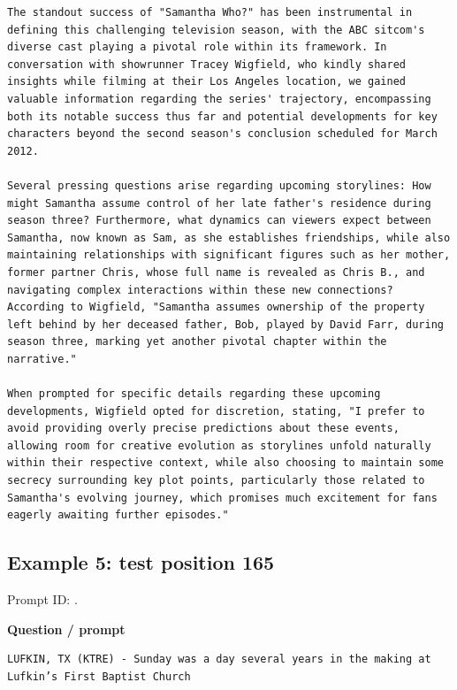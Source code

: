 \begin{Verbatim}
The standout success of "Samantha Who?" has been instrumental in defining this challenging television season, with the ABC sitcom's diverse cast playing a pivotal role within its framework. In conversation with showrunner Tracey Wigfield, who kindly shared insights while filming at their Los Angeles location, we gained valuable information regarding the series' trajectory, encompassing both its notable success thus far and potential developments for key characters beyond the second season's conclusion scheduled for March 2012.

Several pressing questions arise regarding upcoming storylines: How might Samantha assume control of her late father's residence during season three? Furthermore, what dynamics can viewers expect between Samantha, now known as Sam, as she establishes friendships, while also maintaining relationships with significant figures such as her mother, former partner Chris, whose full name is revealed as Chris B., and navigating complex interactions within these new connections? According to Wigfield, "Samantha assumes ownership of the property left behind by her deceased father, Bob, played by David Farr, during season three, marking yet another pivotal chapter within the narrative."

When prompted for specific details regarding these upcoming developments, Wigfield opted for discretion, stating, "I prefer to avoid providing overly precise predictions about these events, allowing room for creative evolution as storylines unfold naturally within their respective context, while also choosing to maintain some secrecy surrounding key plot points, particularly those related to Samantha's evolving journey, which promises much excitement for fans eagerly awaiting further episodes."
\end{Verbatim}

\subsection{Example 5: test position
165}\label{record-docs-watermarking-qualitative-paper-sir-bira-md-example-5-test-position-165}

Prompt ID:
\texttt{}.

\textbf{Question / prompt}

\begin{Verbatim}
LUFKIN, TX (KTRE) - Sunday was a day several years in the making at Lufkin’s First Baptist Church
\end{Verbatim}

